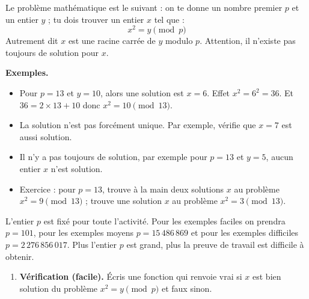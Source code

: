 \documentclass[11pt,class=report,crop=false]{standalone}
\begin{document}
\begin{activite}



Le problème mathématique est le suivant : on te donne un nombre premier $p$  et un entier $y$ ; tu dois trouver un entier $x$ tel que :
$$x^2 = y \pmod{p}$$
Autrement dit $x$ est une racine carrée de $y$ modulo $p$.
Attention, il n'existe pas toujours de solution pour $x$. 

\textbf{Exemples.}
\begin{itemize}
  \item Pour $p=13$ et $y = 10$, alors une solution est $x = 6$.
  Effet $x^2 = 6^2 = 36$. Et $36 = 2\times 13 + 10$ donc $x^2 = 10 \pmod{13}$.
  
  \item La solution n'est pas forcément unique. Par exemple, vérifie que $x=7$ est aussi solution.
  
  \item Il n'y a pas toujours de solution, par exemple pour $p=13$ et $y=5$, aucun entier $x$ n'est solution.
  
  \item Exercice : pour $p = 13$, trouve à la main deux solutions $x$ au problème $x^2 = 9 \pmod{13}$ ; trouve une solution $x$ au problème $x^2 = 3 \pmod{13}$.
  
\end{itemize}


L'entier $p$ est fixé pour toute l'activité. 
Pour les exemples faciles on prendra $p = 101$, pour les exemples moyens $p = 15\,486\,869$ et pour les exemples difficiles $p = 2\,276\,856\,017$. Plus l'entier $p$ est grand, plus la preuve de travail est difficile à obtenir.

\begin{enumerate}
  \item \textbf{Vérification (facile).} 
  \'Ecris une fonction  qui renvoie \og{}vrai\fg{} si $x$ est bien solution du problème $x^2 = y \pmod{p}$ et \og{}faux\fg{} sinon.
  

\end{enumerate}
\end{activite}
\end{document}

